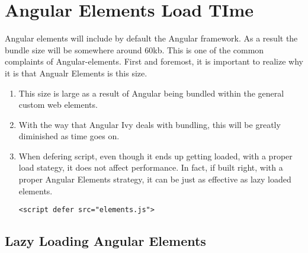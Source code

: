 \chapter{Angular Elements Load TIme}
Angular elements will include by default the Angular framework. As a result the bundle size will be somewhere around 60kb. This is one of the common complaints of Angular-elements. First and foremost, it is important to realize why it is that Angualr Elements is this size. 

\begin{enumerate}
  \item This size is large as a result of Angular being bundled within the general custom web elements.
  \item With the way that Angular Ivy deals with bundling, this will be greatly diminished as time goes on.
  \item When defering script, even though it ends up getting loaded, with a proper load stategy, it does not affect performance. In fact, if built right, with a proper Angular Elements strategy, it can be just as effective as lazy loaded elements.
\begin{verbatim}
<script defer src="elements.js">
\end{verbatim}
\end{enumerate}

\section{ Lazy Loading Angular Elements }

